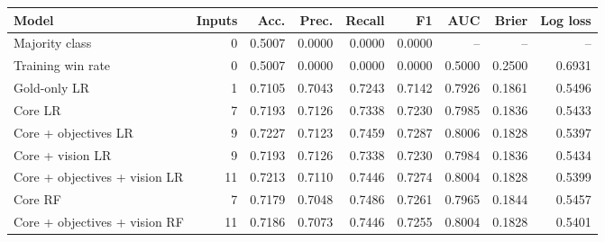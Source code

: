 \begin{tabular}{lrrrrrrrr}
\toprule
Model & Inputs & Acc. & Prec. & Recall & F1 & AUC & Brier & Log loss \\
\midrule
Majority class & 0 & 0.5007 & 0.0000 & 0.0000 & 0.0000 & -- & -- & -- \\
Training win rate & 0 & 0.5007 & 0.0000 & 0.0000 & 0.0000 & 0.5000 & 0.2500 & 0.6931 \\
Gold-only LR & 1 & 0.7105 & 0.7043 & 0.7243 & 0.7142 & 0.7926 & 0.1861 & 0.5496 \\
Core LR & 7 & 0.7193 & 0.7126 & 0.7338 & 0.7230 & 0.7985 & 0.1836 & 0.5433 \\
Core + objectives LR & 9 & 0.7227 & 0.7123 & 0.7459 & 0.7287 & 0.8006 & 0.1828 & 0.5397 \\
Core + vision LR & 9 & 0.7193 & 0.7126 & 0.7338 & 0.7230 & 0.7984 & 0.1836 & 0.5434 \\
Core + objectives + vision LR & 11 & 0.7213 & 0.7110 & 0.7446 & 0.7274 & 0.8004 & 0.1828 & 0.5399 \\
Core RF & 7 & 0.7179 & 0.7048 & 0.7486 & 0.7261 & 0.7965 & 0.1844 & 0.5457 \\
Core + objectives + vision RF & 11 & 0.7186 & 0.7073 & 0.7446 & 0.7255 & 0.8004 & 0.1828 & 0.5401 \\
\bottomrule
\end{tabular}
